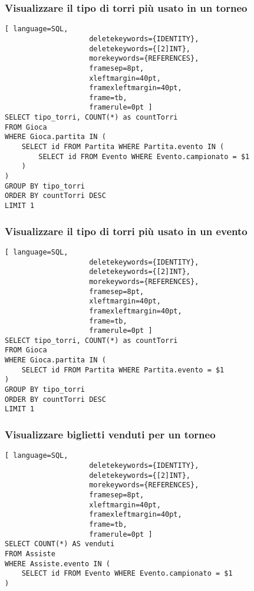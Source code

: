 \documentclass{article}
\begin{document}
\subsubsection{Visualizzare il tipo di torri più usato in un torneo}
\begin{lstlisting}[ language=SQL,
                    deletekeywords={IDENTITY},
                    deletekeywords={[2]INT},
                    morekeywords={REFERENCES},
                    framesep=8pt,
                    xleftmargin=40pt,
                    framexleftmargin=40pt,
                    frame=tb,
                    framerule=0pt ]
SELECT tipo_torri, COUNT(*) as countTorri
FROM Gioca
WHERE Gioca.partita IN (
    SELECT id FROM Partita WHERE Partita.evento IN (
        SELECT id FROM Evento WHERE Evento.campionato = $1
    )
)
GROUP BY tipo_torri
ORDER BY countTorri DESC
LIMIT 1
\end{lstlisting}

\subsubsection{Visualizzare il tipo di torri più usato in un evento}
\begin{lstlisting}[ language=SQL,
                    deletekeywords={IDENTITY},
                    deletekeywords={[2]INT},
                    morekeywords={REFERENCES},
                    framesep=8pt,
                    xleftmargin=40pt,
                    framexleftmargin=40pt,
                    frame=tb,
                    framerule=0pt ]
SELECT tipo_torri, COUNT(*) as countTorri
FROM Gioca
WHERE Gioca.partita IN (
    SELECT id FROM Partita WHERE Partita.evento = $1
)
GROUP BY tipo_torri
ORDER BY countTorri DESC
LIMIT 1
\end{lstlisting}

\subsubsection{Visualizzare biglietti venduti per un torneo}
\begin{lstlisting}[ language=SQL,
                    deletekeywords={IDENTITY},
                    deletekeywords={[2]INT},
                    morekeywords={REFERENCES},
                    framesep=8pt,
                    xleftmargin=40pt,
                    framexleftmargin=40pt,
                    frame=tb,
                    framerule=0pt ]
SELECT COUNT(*) AS venduti
FROM Assiste
WHERE Assiste.evento IN (
    SELECT id FROM Evento WHERE Evento.campionato = $1
)
\end{lstlisting}
\end{document}
